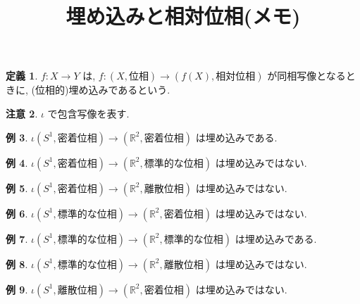 \documentclass[10pt, fleqn, label-section=none]{bxjsarticle}
\title{埋め込みと相対位相(メモ)}
\author{}
\date{}
\theoremstyle{definition}
\newtheorem{dfn}{定義}[section]
\newtheorem{ex}[dfn]{例}
\newtheorem{remark}[dfn]{注意}
\begin{document}
\maketitle
\scriptsize 



\section{}

\begin{dfn}
$f: X \rightarrow Y$ は, $f:(X, \text{位相}) \rightarrow (f(X), \text{相対位相}) $ が同相写像となるときに, (位相的)埋め込みであるという. 
\end{dfn}

\begin{remark}
$\iota$ で包含写像を表す. 
\end{remark}

\begin{ex}
$\iota (S^1, \text{密着位相}) \rightarrow (\mathbb R^2, \text{密着位相})$ は埋め込みである. 
\end{ex}

\begin{ex}
$\iota (S^1, \text{密着位相}) \rightarrow (\mathbb R^2, \text{標準的な位相})$ は埋め込みではない. 
\end{ex}

\begin{ex}
$\iota (S^1, \text{密着位相}) \rightarrow (\mathbb R^2, \text{離散位相})$ は埋め込みではない. 
\end{ex}



\begin{ex}
$\iota (S^1, \text{標準的な位相}) \rightarrow (\mathbb R^2, \text{密着位相})$ は埋め込みではない. 
\end{ex}

\begin{ex}
$\iota (S^1, \text{標準的な位相}) \rightarrow (\mathbb R^2, \text{標準的な位相})$ は埋め込みである. 
\end{ex}

\begin{ex}
$\iota (S^1, \text{標準的な位相}) \rightarrow (\mathbb R^2, \text{離散位相})$ は埋め込みではない. 
\end{ex}



\begin{ex}
$\iota (S^1, \text{離散位相}) \rightarrow (\mathbb R^2, \text{密着位相})$ は埋め込みではない. 
\end{ex}
\end{document}
